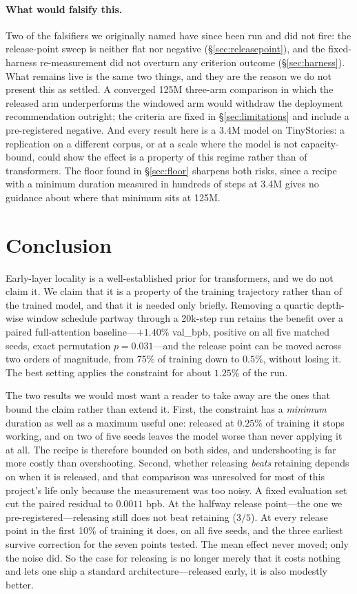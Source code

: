 \documentclass[11pt,a4paper]{article}
\begin{document}
\paragraph{What would falsify this.} Two of the falsifiers we originally named have since been run and did not fire: the release-point sweep is neither flat nor negative (\S\ref{sec:releasepoint}), and the fixed-harness re-measurement did not overturn any criterion outcome (\S\ref{sec:harness}). What remains live is the same two things, and they are the reason we do not present this as settled. A converged 125M three-arm comparison in which the released arm underperforms the windowed arm would withdraw the deployment recommendation outright; the criteria are fixed in \S\ref{sec:limitations} and include a pre-registered negative. And every result here is a 3.4M model on TinyStories: a replication on a different corpus, or at a scale where the model is not capacity-bound, could show the effect is a property of this regime rather than of transformers. The floor found in \S\ref{sec:floor} sharpens both risks, since a recipe with a minimum duration measured in hundreds of steps at 3.4M gives no guidance about where that minimum sits at 125M.

\section{Conclusion}

Early-layer locality is a well-established prior for transformers, and we do not claim it. We claim that it is a property of the training trajectory rather than of the trained model, and that it is needed only briefly. Removing a quartic depth-wise window schedule partway through a 20k-step run retains the benefit over a paired full-attention baseline---$+1.40$\% val\_bpb, positive on all five matched seeds, exact permutation $p=0.031$---and the release point can be moved across two orders of magnitude, from 75\% of training down to $0.5$\%, without losing it. The best setting applies the constraint for about $1.25$\% of the run.

The two results we would most want a reader to take away are the ones that bound the claim rather than extend it. First, the constraint has a \emph{minimum} duration as well as a maximum useful one: released at $0.25$\% of training it stops working, and on two of five seeds leaves the model worse than never applying it at all. The recipe is therefore bounded on both sides, and undershooting is far more costly than overshooting. Second, whether releasing \emph{beats} retaining depends on when it is released, and that comparison was unresolved for most of this project's life only because the measurement was too noisy. A fixed evaluation set cut the paired residual to $0.0011$ bpb. At the halfway release point---the one we pre-registered---releasing still does not beat retaining ($3/5$). At every release point in the first 10\% of training it does, on all five seeds, and the three earliest survive correction for the seven points tested. The mean effect never moved; only the noise did. So the case for releasing is no longer merely that it costs nothing and lets one ship a standard architecture---released early, it is also modestly better.
\end{document}
